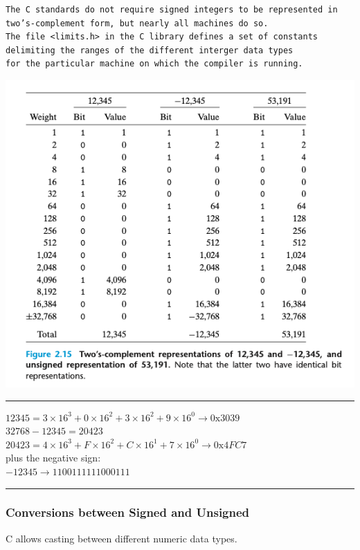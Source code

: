 \documentclass[11pt]{article}
\begin{document}
\begin{verbatim}
The C standards do not require signed integers to be represented in two’s-complement form, but nearly all machines do so.
The file <limits.h> in the C library defines a set of constants delimiting the ranges of the different interger data types
for the particular machine on which the compiler is running.
\end{verbatim}

\begin{center}
\includegraphics[width=.9\linewidth]{pics/two's-complement-to-binary.png}
\end{center}

\noindent\rule{\textwidth}{0.5pt}
\(12345 = 3\times 16^3 + 0\times 16^2 + 3\times 16^2 + 9\times 16^0 \rightarrow 0\mathrm{x}3039\)\\
\(32768 - 12345 = 20423\)\\
\(20423 = 4\times 16^3 + F\times 16^2 + C\times 16^1 + 7\times 16^0 \rightarrow 0\mathrm{x}4FC7\) \\
plus the negative sign:\\
\(-12345 \rightarrow 1100 1111 1100 0111\)\\

\noindent\rule{\textwidth}{0.5pt}

\subsubsection{Conversions between Signed and Unsigned}
\label{sec:org3c404b4}
C allows casting between different numeric data types.\\
\end{document}
